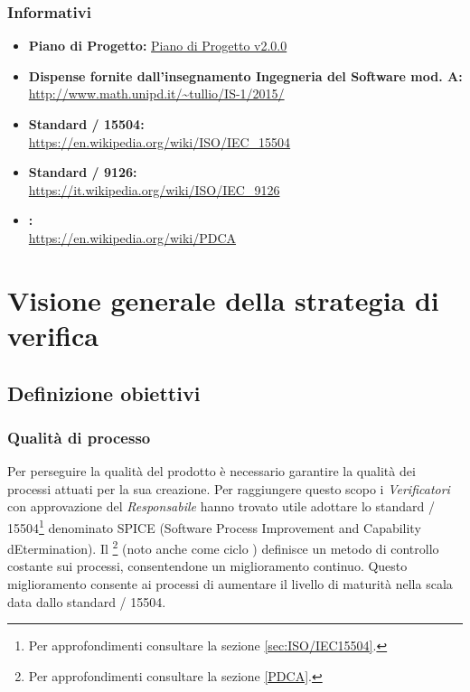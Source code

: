 \documentclass{scalatekids-article}
\begin{document}
\subsubsection{Informativi}
\begin{itemize}
\item\textbf{Piano di Progetto:} \href{run:./PianoDiProgetto\_v2.0.0.pdf}{Piano di Progetto v2.0.0}
\item\textbf{Dispense fornite dall'insegnamento Ingegneria del Software mod. A:}\\
  \url{http://www.math.unipd.it/~tullio/IS-1/2015/}
\item\textbf{Standard / 15504:}\\
\url{https://en.wikipedia.org/wiki/ISO/IEC_15504}
\item\textbf{Standard / 9126:}\\
\url{https://it.wikipedia.org/wiki/ISO/IEC_9126}
\item\textbf{:}\\
\url{https://en.wikipedia.org/wiki/PDCA}
\end{itemize}
\newpage
\section{Visione generale della strategia di verifica}
\subsection{Definizione obiettivi}
\subsubsection{Qualità di processo}
Per perseguire la qualità del prodotto è necessario garantire la qualità dei processi attuati per la sua creazione. Per raggiungere questo scopo i \textit{Verificatori} con approvazione del \textit{Responsabile} hanno trovato utile adottare lo standard / 15504\footnote[1]{Per approfondimenti consultare la sezione \ref{sec:ISO/IEC15504}.} denominato SPICE (Software Process Improvement and Capability dEtermination). Il \footnote[2]{Per approfondimenti consultare la sezione \ref{PDCA}.} (noto anche come ciclo ) definisce un metodo di controllo costante sui processi, consentendone un miglioramento continuo. Questo miglioramento consente ai processi di aumentare il livello di maturità nella scala data dallo standard / 15504.
\end{document}
